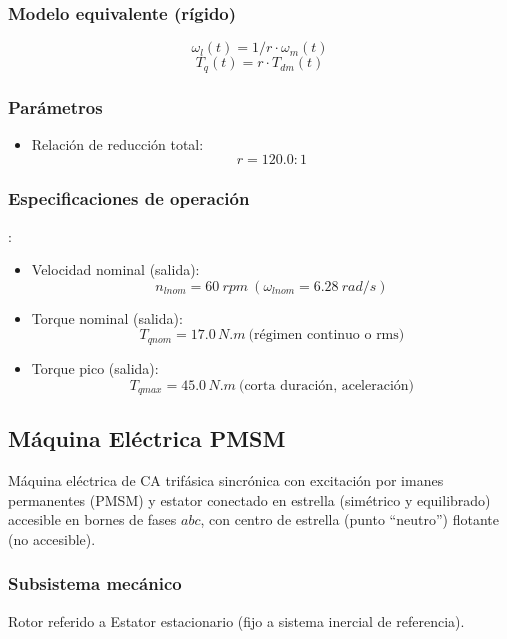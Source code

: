 \documentclass[a4paper, 10pt, journal]{ieeeconf}
\begin{document}
\subsubsection{\textbf{Modelo equivalente (rígido)}}
\begin{equation}
    \omega_l(t) = 1/r \cdot \omega_m(t)
    \label{relación de velocidad en caja}
\end{equation}
\begin{equation}
    T_q(t) = r \cdot T_{dm}(t)
    \label{relación de torque en caja}
\end{equation}



\subsubsection{\textbf{Parámetros}}
\begin{itemize}
    \item Relación de reducción total:
    \[
    r = 120.0 : 1
    \]
\end{itemize}



\subsubsection{\textbf{Especificaciones de operación}}:
\begin{itemize}
    \item Velocidad nominal (salida):
    \[
    n_{lnom} = 60\ rpm \ (\omega_{lnom} = 6.28 \ rad/s)
    \]
    \item Torque nominal (salida):
    \[
    T_{qnom} = 17.0 \, N.m \ \text{(régimen continuo o rms)}
    \]
    \item Torque pico (salida):
    \[
    T_{qmax} = 45.0 \, N.m \ \text{(corta duración, aceleración)}
    \]
\end{itemize}



\subsection{\textbf{Máquina Eléctrica PMSM}}
Máquina eléctrica de CA trifásica sincrónica con excitación por imanes permanentes (PMSM) y estator conectado en estrella (simétrico y equilibrado) accesible en bornes de fases $abc$, con centro de estrella (punto “neutro”) flotante (no accesible).



\subsubsection{\textbf{Subsistema mecánico}}
Rotor referido a Estator estacionario (fijo a sistema inercial de referencia).
\end{document}
